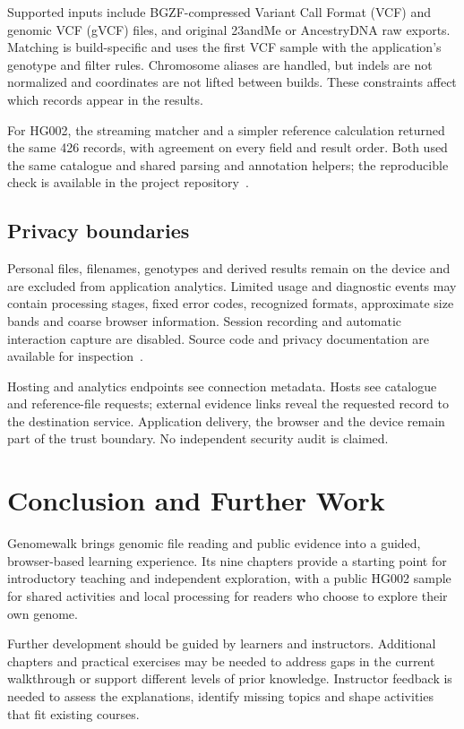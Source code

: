 \documentclass[runningheads]{llncs}
\begin{document}
Supported inputs include BGZF-compressed Variant Call Format (VCF) and genomic VCF (gVCF) files, and original 23andMe or AncestryDNA raw exports. Matching is build-specific and uses the first VCF sample with the application's genotype and filter rules. Chromosome aliases are handled, but indels are not normalized and coordinates are not lifted between builds. These constraints affect which records appear in the results.

For HG002, the streaming matcher and a simpler reference calculation returned the same 426 records, with agreement on every field and result order. Both used the same catalogue and shared parsing and annotation helpers; the reproducible check is available in the project repository~\cite{genomewalk}.

\subsection{Privacy boundaries}
Personal files, filenames, genotypes and derived results remain on the device and are excluded from application analytics. Limited usage and diagnostic events may contain processing stages, fixed error codes, recognized formats, approximate size bands and coarse browser information. Session recording and automatic interaction capture are disabled. Source code and privacy documentation are available for inspection~\cite{genomewalk}.

Hosting and analytics endpoints see connection metadata. Hosts see catalogue and reference-file requests; external evidence links reveal the requested record to the destination service. Application delivery, the browser and the device remain part of the trust boundary. No independent security audit is claimed.

\section{Conclusion and Further Work}
Genomewalk brings genomic file reading and public evidence into a guided, browser-based learning experience. Its nine chapters provide a starting point for introductory teaching and independent exploration, with a public HG002 sample for shared activities and local processing for readers who choose to explore their own genome.

Further development should be guided by learners and instructors. Additional chapters and practical exercises may be needed to address gaps in the current walkthrough or support different levels of prior knowledge. Instructor feedback is needed to assess the explanations, identify missing topics and shape activities that fit existing courses.
\end{document}
